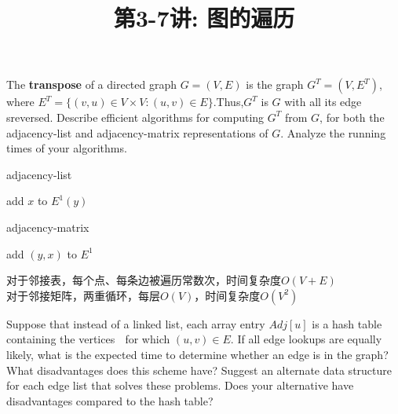 \documentclass[a4paper, justified]{tufte-handout}
\title{第3-7讲: 图的遍历}
\date{\zhtoday} %
\begin{document}
\maketitle
\noplagiarism %
\begin{abstract}
\end{abstract}
\beginrequired

\begin{problem}[TC 22.1-3]
The \textbf{transpose} of a directed graph $G=(V,E)$ is the graph $G^T=(V,E^T)$, where $E^T=\{(v,u)\in V\times V:(u,v) \in E\}$.Thus,$G^T$ is $G$ with all its edge sreversed. Describe efficient algorithms for computing $G^T$ from $G$, for both the adjacency-list and adjacency-matrix representations of $G$. Analyze the running times of your algorithms.
\end{problem}

\begin{solution}
\noindent
\begin{algorithm}
\caption{adjacency-list}\label{euclid}
\begin{algorithmic}[1]
	 	\State add $x$ to $E^{1}(y)$
        \EndFor
\EndFor
\EndProcedure
\end{algorithmic}
\end{algorithm}
\noindent
\noindent
\begin{algorithm}
\caption{adjacency-matrix}\label{euclid}
\begin{algorithmic}[1]
			\State add $(y,x)$ to $E^{1}$
		\EndIf
        \EndFor
\EndFor
\EndProcedure
\end{algorithmic}
\end{algorithm}
\noindent
对于邻接表，每个点、每条边被遍历常数次，时间复杂度$O(V+E)$\\
对于邻接矩阵，两重循环，每层$O(V)$，时间复杂度$O(V^2)$
\end{solution}

\begin{problem}[TC 22.1-8]
Suppose that instead of a linked list, each array entry $Adj[u]$ is a hash table containing the vertices 􏰁 for which $(u,v)\in E$. If all edge lookups are equally likely, what is the expected time to determine whether an edge is in the graph? What disadvantages does this scheme have? Suggest an alternate data structure for each edge list that solves these problems. Does your alternative have disadvantages compared to the hash table?
\end{problem}
\end{document}
